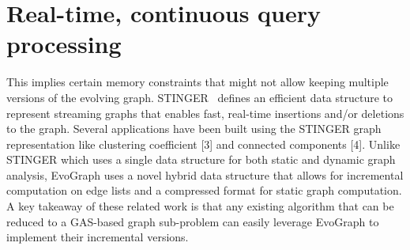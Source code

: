\section{Real-time, continuous query processing} This implies certain memory constraints that might not allow keeping multiple versions of the evolving graph. STINGER~\cite{stinger} defines an efficient data structure to represent streaming graphs that enables fast, real-time insertions and/or deletions to the graph. Several applications have been built using the STINGER graph representation like clustering coefficient [3] and connected components [4]. Unlike STINGER which uses a single data structure for both static and dynamic graph analysis, EvoGraph uses a novel hybrid data structure that allows for incremental computation on edge lists and a compressed format for static graph computation.  A key takeaway of these related work is that any existing algorithm that can be reduced to a GAS-based graph sub-problem can easily leverage EvoGraph to implement their incremental versions.








